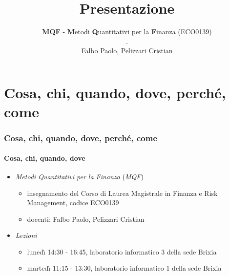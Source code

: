 \documentclass[trans]{beamer}%
\title[Presentazione]{Presentazione}
\subtitle{}
\author[MQF]{%
\textbf{MQF} - \textbf{M}etodi \textbf{Q}uantitativi per la
\textbf{F}inanza (ECO0139) \\ . \\ \small{Falbo Paolo, Pelizzari Cristian}}
\institute{}
\date{}
\newenvironment{stepitemize}{\begin{itemize}[<+->]}{\end{itemize} }
\begin{document}
\maketitle

%
%

\color{light-blue}
\color{black}%
\medskip

\section{Cosa, chi, quando, dove, perch\'{e}, come}%

\begin{frame}%
%

\frametitle{Cosa, chi, quando, dove, perch\'{e}, come}%
%

\framesubtitle{Cosa, chi, quando, dove}%
%

%


\begin{stepitemize}
\item \textit{Metodi Quantitativi per la Finanza} (\textit{MQF})

\begin{stepitemize}
\item insegnamento del Corso di Laurea Magistrale in Finanza e Risk
Management, codice ECO0139

\item docenti: Falbo Paolo, Pelizzari Cristian
\end{stepitemize}

\item \textit{Lezioni}

\begin{stepitemize}
\item luned\`{\i} 14:30 - 16:45, laboratorio informatico 3 della sede Brixia

\item marted\`{\i} 11:15 - 13:30, laboratorio informatico 1 della sede Brixia
\end{stepitemize}
\end{stepitemize}

%

\transboxout
\end{frame}%
%
\end{document}
